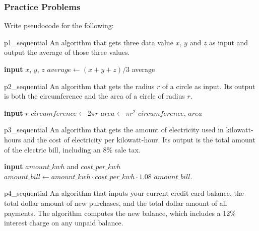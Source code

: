 \subsubsection{Practice Problems}
Write pseudocode for the following:
\begin{problem}{}{p1_sequential}
An algorithm that gets three data value $x$, $y$ and $z$ as input and output the average of those three values.
\end{problem}
\begin{algorithm}
	\caption*{Algorithm for problem ~\ref{prob:p1_sequential}}
	\begin{algorithmic}[1]
		\State \textbf{input} $x$, $y$, $z$
		\State $average \gets (x + y + z) / 3$
		\State \Output average
	\end{algorithmic}
\end{algorithm}

\begin{problem}{}{p2_sequential}
An algorithm that gets the radius $r$ of a circle as input. Its output is both the circumference and the area of a circle of radius $r$.
\end{problem}

\begin{algorithm}
	\caption*{Algorithm for problem ~\ref{prob:p2_sequential}}
	\begin{algorithmic}[1]
		\State \textbf{input} $r$
		\State $circumference \gets 2\pi r$
		\State $area \gets \pi r^2$
		\State \Output $circumference$, $area$
	\end{algorithmic}
\end{algorithm}

\begin{problem}{}{p3_sequential}
An algorithm that gets the amount of electricity used in kilowatt-hours and the cost of electricity per kilowatt-hour. Its output is the total amount of the electric bill, including an $8\%$ sale tax.
\end{problem}

\begin{algorithm}
	\caption*{Algorithm for problem ~\ref{prob:p3_sequential}}
	\begin{algorithmic}[1]
		\State \textbf{input} $amount\_kwh$ and $cost\_per\_kwh$
		\State $amount\_bill\gets amount\_kwh\cdot cost\_per\_kwh \cdot 1.08$
		\State \Output $amount\_bill$.
	\end{algorithmic}
\end{algorithm}

\begin{problem}{}{p4_sequential}
An algorithm that inputs your current credit card balance, the total dollar amount of new purchases, and the total dollar amount of all payments. The algorithm computes the new balance, which includes a 12$\%$ interest charge on any unpaid balance.
\end{problem}


